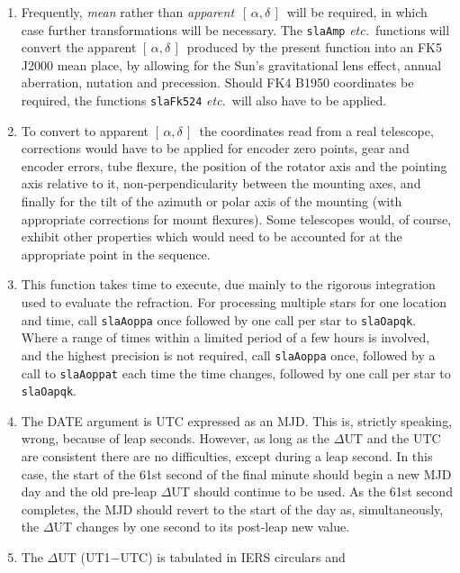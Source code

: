 \documentclass[11pt,fleqn,twoside]{article}
\renewcommand{\_}{{\tt\char'137}}     %
\newcommand{\radec}     {$[\,\alpha,\delta\,]$}
\begin{document}
{\begin{enumerate}
        geocentric apparent \radec\ is obtained.
  \item Frequently, {\it mean}\/ rather than {\it apparent}\,
        \radec\ will be required,
        in which case further transformations will be necessary.  The
        {\tt slaAmp} {\it etc.}\ functions will convert
        the apparent \radec\ produced
        by the present function into an FK5 J2000 mean place, by
        allowing for the Sun's gravitational lens effect, annual
        aberration, nutation and precession.  Should FK4 B1950
        coordinates be required, the functions
        {\tt slaFk524} {\it etc.}\ will also
        have to be applied.
  \item To convert to apparent \radec\ the coordinates read from a
        real telescope, corrections would have to be applied for
        encoder zero points, gear and encoder errors, tube flexure,
        the position of the rotator axis and the pointing axis
        relative to it, non-perpendicularity between the mounting
        axes, and finally for the tilt of the azimuth or polar axis
        of the mounting (with appropriate corrections for mount
        flexures).  Some telescopes would, of course, exhibit other
        properties which would need to be accounted for at the
        appropriate point in the sequence.
  \item This function takes time to execute, due mainly to the
        rigorous integration used to evaluate the refraction.
        For processing multiple stars for one location and time,
        call {\tt slaAoppa} once followed by one call per star to {\tt slaOapqk}.
        Where a range of times within a limited period of a few hours
        is involved, and the highest precision is not required, call
        {\tt slaAoppa} once, followed by a call to {\tt slaAoppat} each time the
        time changes, followed by one call per star to {\tt slaOapqk}.
  \item The DATE argument is UTC expressed as an MJD.  This is,
        strictly speaking, wrong, because of leap seconds.  However,
        as long as the $\Delta$UT and the UTC are consistent there
        are no difficulties, except during a leap second.  In this
        case, the start of the 61st second of the final minute should
        begin a new MJD day and the old pre-leap $\Delta$UT should
        continue to be used.  As the 61st second completes, the MJD
        should revert to the start of the day as, simultaneously,
        the $\Delta$UT changes by one second to its post-leap new value.
  \item The $\Delta$UT (UT1$-$UTC) is tabulated in IERS circulars and

\end{enumerate}}
\end{document}
